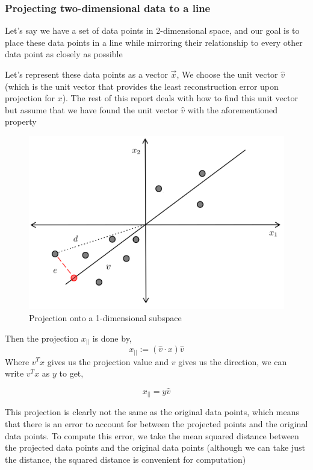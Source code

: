 \documentclass[conference]{IEEEtran}
\begin{document}
\subsubsection{Projecting two-dimensional data to a line}

Let's say we have a set of data points in 2-dimensional space, and our goal is to place these data points in a line while mirroring their relationship to every other data point as closely as possible

Let's represent these data points as a vector \(\vec{x}\), We choose the unit vector \(\hat{v}\) (which is the unit vector that provides the least reconstruction error upon projection for \(x\)). The rest of this report deals with how to find this unit vector but assume that we have found the unit vector \(\hat{v}\) with the aforementioned property

\begin{figure}
	\centering
	\includegraphics[width=1\linewidth] {assets/2024-08-20-Note-16-54.png}
	\caption{Projection onto a 1-dimensional subspace}
	\label{fig:enter-label}
\end{figure}

Then the projection \(x_{||}\) is done by,
$$x_{||} := (\hat{v} \cdot x) \hat{v}$$
Where \(v^Tx\) gives us the projection value and  \(v\) gives us the direction, we can write \(v^Tx\) as \(y\) to get,

$$x_{||} = y \hat{v} $$

This projection is clearly not the same as the original data points, which means that there is an error to account for between the projected points and the original data points. To compute this error, we take the mean squared distance between the projected data points and the original data points (although we can take just the distance, the squared distance is convenient for computation)
\end{document}
